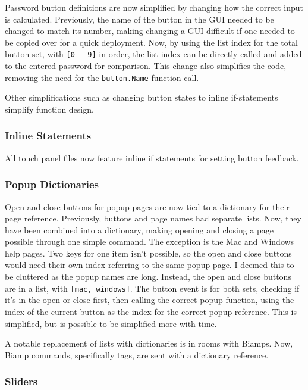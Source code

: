 \documentclass{article}
\begin{document}
Password button definitions are now simplified by changing how the correct input is calculated. Previously, the name of the 
button in the GUI needed to be changed to match its number, making changing a GUI difficult if one needed to be copied over
for a quick deployment. Now, by using the list index for the total button set, with \lstinline|[0 - 9]| in order, the list 
index can be directly called and added to the entered password for comparison. This change also simplifies the code, removing
the need for the \lstinline|button.Name| function call. 

Other simplifications such as changing button states to inline if-statements simplify function design. 

\subsubsection*{Inline Statements}

All touch panel files now feature inline if statements for setting button feedback. 

\subsubsection*{Popup Dictionaries}

Open and close buttons for popup pages are now tied to a dictionary for their page reference. Previously, buttons and page 
names had separate lists. Now, they have been combined into a dictionary, making opening and closing a page possible through 
one simple command. The exception is the Mac and Windows help pages. Two keys for one item isn't possible, so the open and 
close buttons would need their own index referring to the same popup page. I deemed this to be cluttered as the popup names 
are long. Instead, the open and close buttons are in a list, with \lstinline|[mac, windows]|. The button event is for both
sets, checking if it's in the open or close first, then calling the correct popup function, using the index of the current 
button as the index for the correct popup reference. This is simplified, but is possible to be simplified more with time. 

A notable replacement of lists with dictionaries is in rooms with Biamps. Now, Biamp commands, specifically tags, are sent 
with a dictionary reference. 

\subsubsection*{Sliders}
\end{document}
